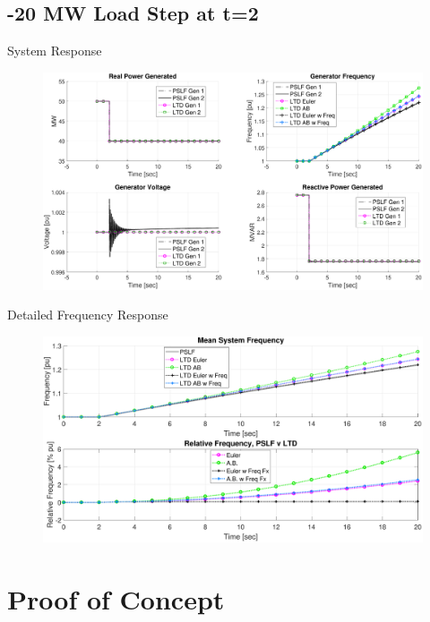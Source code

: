 \documentclass[14pt, unknownkeysallowed]{beamer}
\begin{document}
\subsection{-20 MW Load Step at t=2}
\begin{frame}
System Response
\begin{figure}
	\includegraphics[width=\linewidth]{noGovExcLoadStepDsys}
\end{figure}
\end{frame}
\begin{frame}
Detailed Frequency Response
\begin{figure}
\includegraphics[width=\linewidth]{noGovExcLoadStepDfreq}
\end{figure}
\end{frame}

\section{Proof of Concept}
\end{document}
